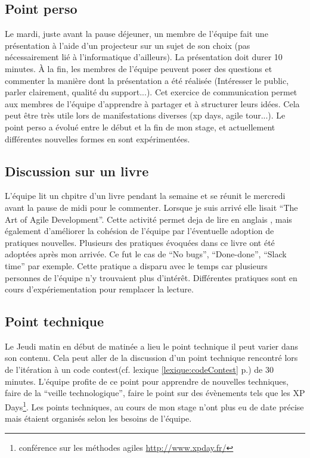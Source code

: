 \subsection*{Point perso}
Le mardi, juste avant la pause déjeuner, un membre de l'équipe fait une présentation à l'aide d'un projecteur sur un sujet de son choix (pas nécessairement lié à l'informatique d'ailleurs). La présentation doit durer 10 minutes. À la fin, les membres de l'équipe peuvent poser des questions et commenter la manière dont la présentation a été réalisée (Intéresser le public, parler clairement, qualité du support...). Cet exercice de communication permet aux membres de l'équipe d'apprendre à partager et à structurer leurs idées. Cela peut être très utile lors de manifestations diverses (xp days, agile tour...). Le point perso a évolué entre le début et la fin de mon stage, et actuellement différentes nouvelles formes en sont expérimentées.

\subsection*{Discussion sur un livre}
L'équipe lit un chpitre d'un livre pendant la semaine et se réunit le mercredi avant la pause de midi pour le commenter. Lorsque je suis arrivé elle lisait ``The Art of Agile Development''. Cette activité permet deja de lire en anglais , mais également d'améliorer la cohésion de l'équipe par l'éventuelle adoption de pratiques nouvelles. Plusieurs des pratiques évoquées dans ce livre ont été adoptées après mon arrivée. Ce fut le cas de ``No bugs'', ``Done-done'', ``Slack time'' par exemple. Cette pratique a disparu avec le temps car plusieurs personnes de l'équipe n'y trouvaient plus d'intérêt. Différentes pratiques sont en cours d'expériementation pour remplacer la lecture.

\subsection*{Point technique}
Le Jeudi matin en début de matinée a lieu le point technique il peut varier dans son contenu. Cela peut aller de la discussion d'un point technique rencontré lors de l'itération à un code contest(cf. lexique \ref{lexique:codeContest} p.\pageref{lexique:codeContest}) de 30 minutes. L'équipe profite de ce point pour apprendre de nouvelles techniques, faire de la ``veille technologique'', faire le point sur des évènements tels que les XP Days\footnote{conférence sur les méthodes agiles \url{http://www.xpday.fr/}}. Les points techniques, au cours de mon stage n'ont plus eu de date précise mais étaient organisés selon les besoins de l'équipe.
